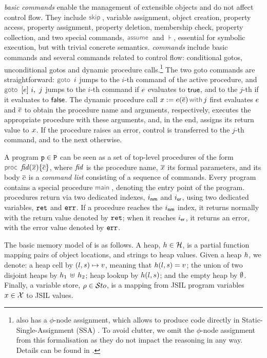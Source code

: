 \jsil \emph{basic commands} enable the management of extensible objects and do not affect control flow. 
They include $\jsilskip$, variable assignment, object creation, property access, property assignment, property deletion, membership check, property collection, and two special commands, $\assume$ and $\assert$, essential for symbolic execution, but with trivial concrete semantics.
%
\jsil \emph{commands} include \jsil basic commands and several commands related to control flow: conditional gotos, unconditional gotos and dynamic procedure calls.\footnote{\jsil also has a $\phi$-node assignment, which allows \JSComp to produce code directly in Static-Single-Assignment (SSA) \cite{SSA}. To avoid clutter, we omit the $\phi$-node assignment from this formalisation as they do not impact the reasoning in any way. Details can be found in \cite{javert}.} 
The two goto commands are straightforward: $\goto \ i$ jumps to the $i$-th command of the active procedure, and $\ifgoto{\jsilexpr}{i}{j}$ jumps to the $i$-th command if $e$ evaluates to ${\sf true}$, and to the $j$-th if it evaluates to ${\sf false}$. 
The dynamic procedure call $\jsilcall{\jvar}{\jsilexpr}{\jvec{\jsilexpr}}{j}$ first evaluates  $e$ and $\overline{e}$ to obtain the procedure name and arguments, respectively, executes the appropriate procedure with these arguments, and, in the end, assigns its return value to $x$.
If the procedure raises an error, control is transferred to the $j$-th command, and to the next otherwise. 

A \jsil program $\mathtt{p} \in \mathtt{P}$ can be seen as a set of top-level procedures of the form $\procedure{\fid}{\jvec{\jvar}}{\jvec{\jcmd}}$, where $\mathit{fid}$ is the procedure name, $\overline{x}$ its formal parameters, and its body ${\overline{c}}$  is a \emph{command list} consisting of a sequence of \jsil commands.
Every \jsil program contains a special procedure $\jsilmain$\hspace{-2pt}, denoting the entry point of the program. 
\jsil procedures return via two dedicated indexes, $i_{{\sf nm}}$ and $i_{{\sf er}}$, using two dedicated variables, $\mathtt{ret}$ and $\mathtt{err}$. If a procedure reaches the $i_{{\sf nm}}$ index, it returns normally with the return value denoted by $\mathtt{ret}$; when it reaches $i_{{\sf er}}$, it returns an error, with the error value denoted by $\mathtt{err}$.

The basic memory model of \jsil is as follows. 
A \jsil heap, $h \in {\mathcal H}$, is a partial function mapping pairs of  object locations, and strings to heap values. 
 Given a heap $h$, we denote: a heap cell by $(l, s) \mapsto v$, meaning that  $h(l,s) = v$; the union of two disjoint heaps by $h_1 \, \uplus \, h_2$; heap lookup by $h(l, s)$; and the empty heap by $\emptyset$.
 Finally, a \jsil variable store, $\rho \in \mathcal{S}to$, is a mapping from JSIL program variables $x \in \mathcal{X}$ to JSIL values.

